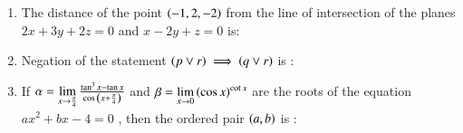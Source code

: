 \documentclass[journal]{IEEEtran}
\begin{document}
\begin{enumerate}[start=1]
\begin{enumerate}
\end{enumerate}
\item %
The distance of the point $\left(-1,2,-2\right)$ from the line of intersection of the planes $2x+3y+2z=0$ and $x-2y+z=0$ is:
\begin{enumerate}
\end{enumerate}
\item %
Negation of the statement $\left(p \vee r \right) \implies \left(q \vee r \right)$ is :
\begin{enumerate}
\end{enumerate}
\item %
If $\alpha = \lim\limits_{x \to \frac{\pi}{4}} \frac{\tan^3{x}-\tan{x}}{\cos{\ensuremath{\left(x+\frac{\pi}{4}\right)}} }$ and $\beta = \lim\limits_{x \to 0} \left(\cos{x}\right)^{\cot{x}}$ are the roots of the equation $ax^2+bx-4=0$ , then the ordered pair $\left(a,b\right)$ is :
\begin{enumerate}
\begin{multicols}{2}

\end{multicols}
\end{enumerate}
\end{enumerate}
\end{document}
